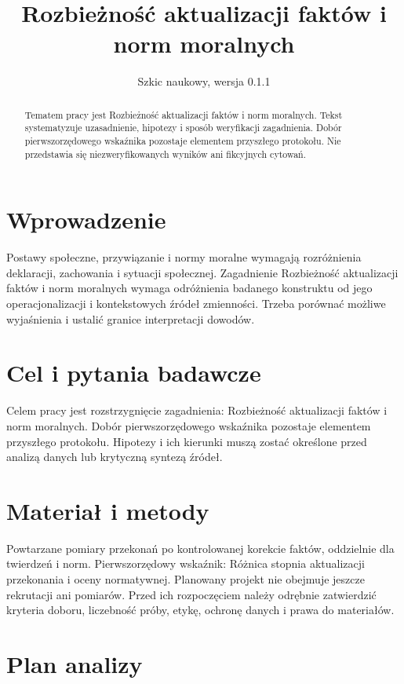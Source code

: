 \documentclass[11pt,a4paper]{article}
\title{Rozbieżność aktualizacji faktów i norm moralnych}
\author{}
\date{Szkic naukowy, wersja 0.1.1}
\begin{document}
\maketitle

\begin{abstract}

Tematem pracy jest Rozbieżność aktualizacji faktów i norm moralnych. Tekst systematyzuje uzasadnienie, hipotezy i sposób weryfikacji zagadnienia. Dobór pierwszorzędowego wskaźnika pozostaje elementem przyszłego protokołu. Nie przedstawia się niezweryfikowanych wyników ani fikcyjnych cytowań.

\end{abstract}

\section{Wprowadzenie}

Postawy społeczne, przywiązanie i normy moralne wymagają rozróżnienia deklaracji, zachowania i sytuacji społecznej. Zagadnienie Rozbieżność aktualizacji faktów i norm moralnych wymaga odróżnienia badanego konstruktu od jego operacjonalizacji i kontekstowych źródeł zmienności. Trzeba porównać możliwe wyjaśnienia i ustalić granice interpretacji dowodów.

\section{Cel i pytania badawcze}

Celem pracy jest rozstrzygnięcie zagadnienia: Rozbieżność aktualizacji faktów i norm moralnych. Dobór pierwszorzędowego wskaźnika pozostaje elementem przyszłego protokołu. Hipotezy i ich kierunki muszą zostać określone przed analizą danych lub krytyczną syntezą źródeł.

\section{Materiał i metody}

Powtarzane pomiary przekonań po kontrolowanej korekcie faktów, oddzielnie dla twierdzeń i norm. Pierwszorzędowy wskaźnik: Różnica stopnia aktualizacji przekonania i oceny normatywnej. Planowany projekt nie obejmuje jeszcze rekrutacji ani pomiarów. Przed ich rozpoczęciem należy odrębnie zatwierdzić kryteria doboru, liczebność próby, etykę, ochronę danych i prawa do materiałów.

\section{Plan analizy}
\end{document}
